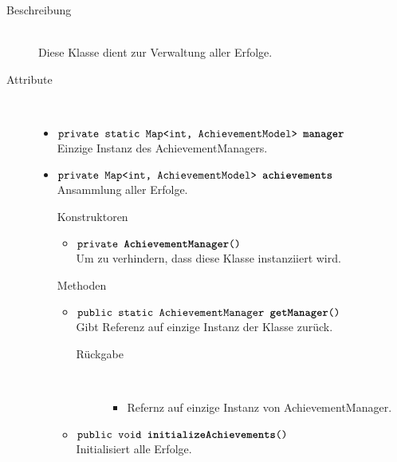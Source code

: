 \begin{description}
\item[Beschreibung] \hfill \\ Diese Klasse dient zur Verwaltung aller Erfolge.
\item[Attribute] \hfill \\
	\vspace{-.8cm}
	\begin{itemize}
		\item $\texttt{private static Map<int, AchievementModel> \textbf{manager}}$ \\ Einzige Instanz des AchievementManagers.
		\item $\texttt{private Map<int, AchievementModel> \textbf{achievements}}$ \\ Ansammlung aller Erfolge.
\item[Konstruktoren] \hfill \\
	\vspace{-.8cm}
	\begin{itemize}
		\item $\texttt{private \textbf{AchievementManager}()}$ \\ Um zu verhindern, dass diese Klasse instanziiert wird.
	\end{itemize}
	
\item[Methoden] \hfill \\
	\vspace{-.8cm}
	\begin{itemize}
		
		\item $\texttt{public static AchievementManager \textbf{getManager}()}$ \\ Gibt Referenz auf einzige Instanz der Klasse zurück.
		\begin{description}
			\item[Rückgabe] \hfill \\
			\vspace{-.8cm}
			\begin{itemize}
				\item Refernz auf einzige Instanz von AchievementManager.
			\end{itemize}
		\end{description}
		
		
		\item $\texttt{public void \textbf{initializeAchievements}()}$ \\ Initialisiert alle Erfolge.
	

\end{itemize}
\end{itemize}
\end{description}
